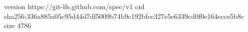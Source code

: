 version https://git-lfs.github.com/spec/v1
oid sha256:336a885a05c95d44d7df5009b74b9c192bfce327e5e6339cd0f0e164ecce5b8c
size 4786
